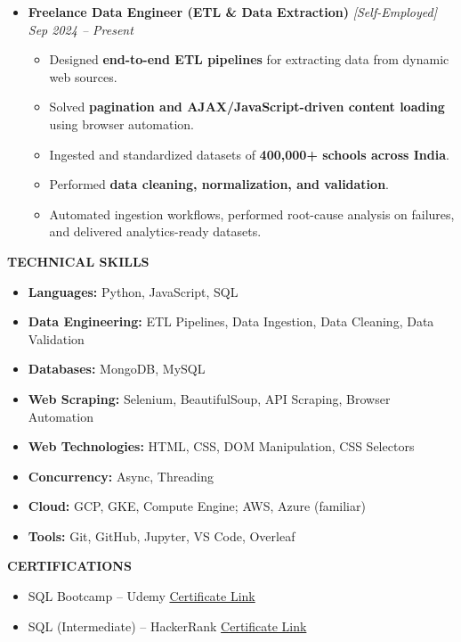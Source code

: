 \documentclass[a4paper,10pt]{article}
\newcommand{\resheading}[1]{{\small \colorbox{mygrey}{\begin{minipage}{0.975\textwidth}{\textbf{#1}}\end{minipage}}}}
\begin{document}
\begin{itemize}

\item {\bf Freelance Data Engineer (ETL \& Data Extraction)} \textit{[Self-Employed]}
\textit{\hfill {Sep 2024 -- Present}}

\begin{itemize}
\item Designed \textbf{end-to-end ETL pipelines} for extracting data from dynamic web sources.
\item Solved \textbf{pagination and AJAX/JavaScript-driven content loading} using browser automation.
\item Ingested and standardized datasets of \textbf{400,000+ schools across India}.
\item Performed \textbf{data cleaning, normalization, and validation}.
\item Automated ingestion workflows, performed root-cause analysis on failures,
and delivered analytics-ready datasets.
\end{itemize}

\end{itemize}

\resheading{\textbf{TECHNICAL SKILLS}}

\begin{itemize}
\item \textbf{Languages:} Python, JavaScript, SQL
\item \textbf{Data Engineering:} ETL Pipelines, Data Ingestion, Data Cleaning, Data Validation
\item \textbf{Databases:} MongoDB, MySQL
\item \textbf{Web Scraping:} Selenium, BeautifulSoup, API Scraping, Browser Automation
\item \textbf{Web Technologies:} HTML, CSS, DOM Manipulation, CSS Selectors
\item \textbf{Concurrency:} Async, Threading
\item \textbf{Cloud:} GCP, GKE, Compute Engine; AWS, Azure (familiar)
\item \textbf{Tools:} Git, GitHub, Jupyter, VS Code, Overleaf
\end{itemize}

\resheading{\textbf{CERTIFICATIONS}}

\begin{itemize}
\item SQL Bootcamp -- Udemy
\href{https://www.udemy.com/certificate/UC-d3b76d22-69b1-45dc-86fd-7a969b920a5e/}{Certificate Link}

\item SQL (Intermediate) -- HackerRank
\href{https://www.hackerrank.com/certificates/4e195a7134d8}{Certificate Link}


\end{itemize}
\end{document}

